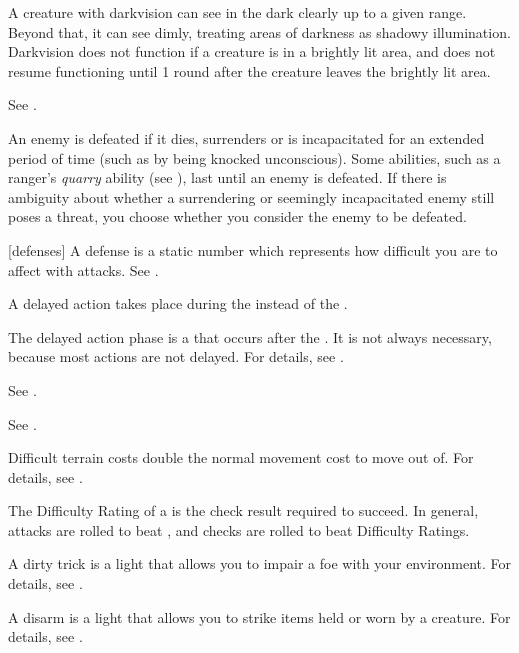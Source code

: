  A creature with darkvision can see in the dark clearly up to a given range.
Beyond that, it can see dimly, treating areas of darkness as shadowy illumination.
Darkvision does not function if a creature is in a brightly lit area, and does not resume functioning until 1 round after the creature leaves the brightly lit area.

 See .

 An enemy is defeated if it dies, surrenders or is incapacitated for an extended period of time (such as by being knocked unconscious).
Some abilities, such as a ranger's \textit{quarry} ability (see ), last until an enemy is defeated.
If there is ambiguity about whether a surrendering or seemingly incapacitated enemy still poses a threat, you choose whether you consider the enemy to be defeated.

[defenses] A defense is a static number which represents how difficult you are to affect with attacks. See .

 A delayed action takes place during the  instead of the .

 The delayed action phase is a  that occurs after the .
It is not always necessary, because most actions are not delayed.
For details, see .

 See .

 See .

 Difficult terrain costs double the normal movement cost to move out of.
For details, see .

 The Difficulty Rating of a  is the check result required to succeed.
In general, attacks are rolled to beat , and checks are rolled to beat Difficulty Ratings.

 A dirty trick is a light  that allows you to impair a foe with your environment.
For details, see .

 A disarm is a light  that allows you to strike items held or worn by a creature.
For details, see .

